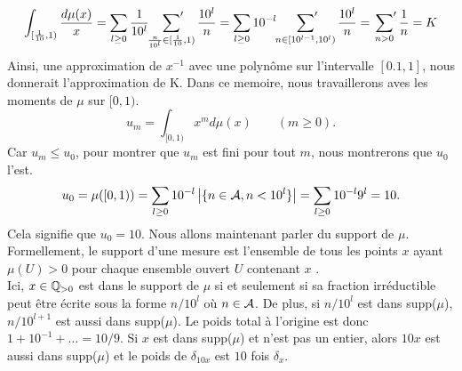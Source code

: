 \begin{equation}
	\int_{[\frac{1}{10}, 1)} \frac{d\mu(x)}{x} = \sum_{l\ge
	0}\frac{1}{10^{l}}\sideset{}{'}\sum_{\frac{n}{10^{l}}\in [\frac{1}{10}, 1)}
	\frac{10^{l}}{n} = \sum_{l\ge0} 10^{-l} \sideset{}{'}\sum_{n\in [10^{l-1}, 10^{l})}
	\frac{10^{l}}{n} = \sideset{}{'}\sum_{n>0} \frac{1}{n} = K
	\label{eq:kintegralburnol}
\end{equation}
Ainsi, une approximation de $x^{-1}$ avec une polyn\^{o}me sur l'intervalle
$[0.1, 1]$, nous donnerait l'approximation de K. Dans ce memoire, nous
travaillerons aves les moments de $\mu$ sur $[0, 1)$.
\begin{equation}
	u_{m} = \int_{[0,1)}x^{m}d\mu(x) \qquad (m\ge0).
	\label{eq:momentburnol}
\end{equation}
Car $u_{m} \le u_{0}$, pour montrer que $u_{m}$ est fini pour tout $m$, nous
montrerons que $u_{0}$ l'est.
\[
	u_{0} = \mu([0, 1)) = \sum_{l\ge 0}10^{-l} \left| \{n\in \mathcal{A}, n<10^{l}\}
	\right| = \sum_{l\ge0}10^{-l}9^{l} = 10.
\]
Cela signifie que $u_{0} = 10$. Nous allons maintenant parler du support de
$\mu$. Formellement, le support d'une mesure est l'ensemble de tous les points
$x$ ayant $\mu(U)>0$ pour chaque ensemble ouvert $U$ contenant $x$
\cite[D\'efinition 2.1]{measure}.\\

Ici, $x\in \mathbb{Q}_{>0}$ est dans le support de $\mu$ si et seulement si sa fraction
irréductible peut être écrite sous la forme $n/10^{l}$ où $n\in\mathcal{A}$. De plus, si
$n/10^{l}$ est dans supp($\mu$), $n/10^{l+1}$ est aussi dans supp($\mu$). Le
poids total à l'origine est donc $1+ 10^{-1} + \ldots = 10/9$. Si $x$ est dans
supp($\mu$) et n'est pas un entier, alors $10x$ est aussi dans supp($\mu$) et
le poids de $\delta_{10x}$ est $10$ fois $\delta_{x}$.


